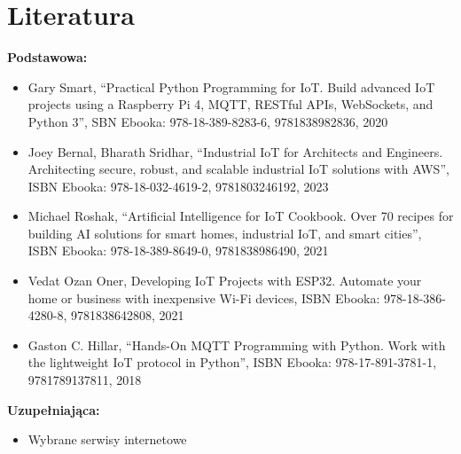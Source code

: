 \documentclass[12pt, a4paper]{article}
\begin{document}
\section{Literatura}

\textbf{Podstawowa:}
\begin{itemize}
  \item Gary Smart, “Practical Python Programming for IoT. Build advanced IoT projects using a Raspberry Pi 4, MQTT, RESTful APIs, WebSockets, and Python 3”, SBN Ebooka: 978-18-389-8283-6, 9781838982836, 2020
  \item Joey Bernal, Bharath Sridhar, “Industrial IoT for Architects and Engineers. Architecting secure, robust, and scalable industrial IoT solutions with AWS”, ISBN Ebooka: 978-18-032-4619-2, 9781803246192, 2023
  \item Michael Roshak, “Artificial Intelligence for IoT Cookbook. Over 70 recipes for building AI solutions for smart homes, industrial IoT, and smart cities”, ISBN Ebooka: 978-18-389-8649-0, 9781838986490, 2021
  \item Vedat Ozan Oner, Developing IoT Projects with ESP32. Automate your home or business with inexpensive Wi-Fi devices, ISBN Ebooka: 978-18-386-4280-8, 9781838642808, 2021
  \item Gaston C. Hillar, “Hands-On MQTT Programming with Python. Work with the lightweight IoT protocol in Python”, ISBN Ebooka: 978-17-891-3781-1, 9781789137811, 2018
\end{itemize}

\textbf{Uzupełniająca:}
\begin{itemize}
  \item Wybrane serwisy internetowe
\end{itemize}
\end{document}
